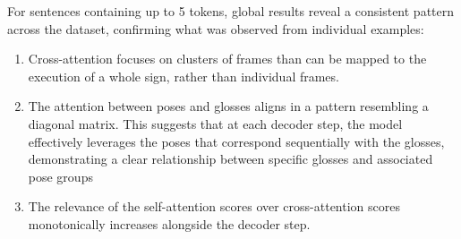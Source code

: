 
For sentences containing up to 5 tokens, global results reveal a consistent pattern across the dataset, confirming what was observed from individual examples: 

\begin{enumerate}
    
    \item Cross-attention focuses on clusters of frames than can be mapped to the execution of a whole sign, rather than individual frames.

    \item The attention between poses and glosses aligns in a pattern resembling a diagonal matrix. This suggests that at each decoder step, the model effectively leverages the poses that correspond sequentially with the glosses, demonstrating a clear relationship between specific glosses and associated pose groups

    \item The relevance of the self-attention scores over cross-attention scores monotonically increases alongside the decoder step.
    
\end{enumerate}

